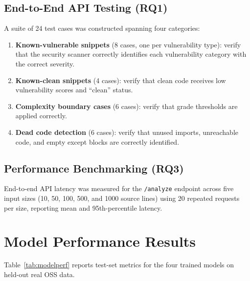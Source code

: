 \documentclass[12pt, oneside]{report}
\begin{document}
\subsection{End-to-End API Testing (RQ1)}

A suite of 24 test cases was constructed spanning four categories:

\begin{enumerate}
  \item \textbf{Known-vulnerable snippets} (8 cases, one per vulnerability type): verify
    that the security scanner correctly identifies each vulnerability category with the
    correct severity.
  \item \textbf{Known-clean snippets} (4 cases): verify that clean code receives low
    vulnerability scores and ``clean'' status.
  \item \textbf{Complexity boundary cases} (6 cases): verify that grade thresholds are
    applied correctly.
  \item \textbf{Dead code detection} (6 cases): verify that unused imports, unreachable
    code, and empty except blocks are correctly identified.
\end{enumerate}

\subsection{Performance Benchmarking (RQ3)}

End-to-end API latency was measured for the \texttt{/analyze} endpoint across five input
sizes (10, 50, 100, 500, and 1000 source lines) using 20 repeated requests per size,
reporting mean and 95th-percentile latency.

\section{Model Performance Results}
\label{sec:model-results}

Table~\ref{tab:modelperf} reports test-set metrics for the four trained models on
held-out real OSS data.
\end{document}
